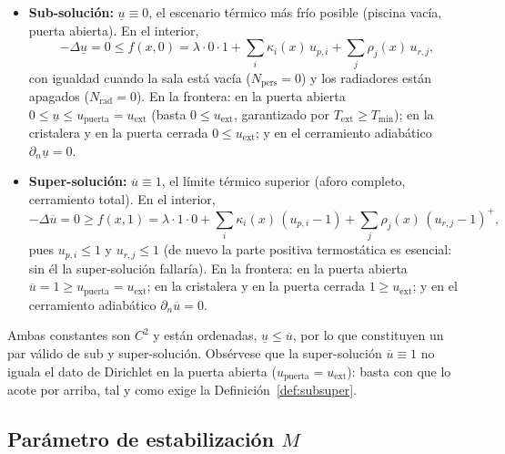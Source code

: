 \begin{itemize}
\begin{itemize}
  \item \textbf{Sub-solución:} $\underline{u} \equiv 0$, el escenario térmico más
  frío posible (piscina vacía, puerta abierta). En el interior,
  \begin{equation*}
    -\Delta \underline{u} = 0 \leq f(x, 0) = \lambda \cdot 0 \cdot 1
    + \sum_{i} \kappa_i(x)\, u_{p,i}
    + \sum_{j} \rho_j(x)\, u_{r,j},
  \end{equation*}
  con igualdad cuando la sala está vacía ($N_{\mathrm{pers}} = 0$) y los
  radiadores están apagados ($N_{\mathrm{rad}} = 0$). En la
  frontera: en la puerta abierta $0 \leq \underline{u} \leq u_{\mathrm{puerta}}
  = u_{\mathrm{ext}}$ (basta $0 \leq u_{\mathrm{ext}}$, garantizado por
  $T_{\mathrm{ext}} \geq T_{\min}$); en la
  cristalera y en la puerta cerrada $0 \leq u_{\mathrm{ext}}$; y en el
  cerramiento adiabático $\partial_n \underline{u} = 0$.

  \item \textbf{Super-solución:} $\overline{u} \equiv 1$, el límite térmico
  superior (aforo completo, cerramiento total). En el interior,
  \begin{equation*}
    -\Delta \overline{u} = 0 \geq f(x, 1) = \lambda \cdot 1 \cdot 0
    + \sum_{i} \kappa_i(x)\,(u_{p,i} - 1)
    + \sum_{j} \rho_j(x)\,(u_{r,j} - 1)^{+},
  \end{equation*}
  pues $u_{p,i} \leq 1$ y $u_{r,j} \leq 1$ (de nuevo la parte positiva termostática es
  esencial: sin él la super-solución fallaría). En la frontera: en la puerta abierta
  $\overline{u} = 1 \geq u_{\mathrm{puerta}} = u_{\mathrm{ext}}$; en la cristalera y en la
  puerta cerrada $1 \geq u_{\mathrm{ext}}$; y en el cerramiento adiabático
  $\partial_n \overline{u} = 0$.
\end{itemize}

Ambas constantes son $C^{2}$ y están ordenadas, $\underline{u} \leq
\overline{u}$, por lo que constituyen un par válido de sub y super-solución.
Obsérvese que la super-solución $\overline{u} \equiv 1$ no iguala el dato de
Dirichlet en la puerta abierta ($u_{\mathrm{puerta}} = u_{\mathrm{ext}}$): basta con que lo
acote por arriba, tal y como exige la Definición~\ref{def:subsuper}.

\subsection{Parámetro de estabilización $M$}


\end{itemize}
